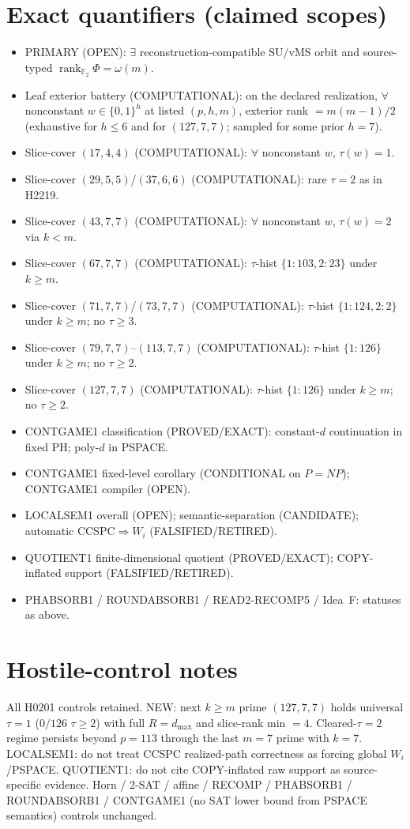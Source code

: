 \documentclass[11pt]{article}
\begin{document}
\section*{Exact quantifiers (claimed scopes)}
\begin{itemize}
\item PRIMARY (OPEN): $\exists$ reconstruction-compatible SU/vMS orbit and source-typed
  $\operatorname{rank}_{\mathbb F_2}\Phi=\omega(m)$.
\item Leaf exterior battery (COMPUTATIONAL): on the declared realization, $\forall$ nonconstant
  $w\in\{0,1\}^h$ at listed $(p,h,m)$, exterior rank $=m(m-1)/2$
  (exhaustive for $h\le6$ and for $(127,7,7)$; sampled for some prior $h{=}7$).
\item Slice-cover $(17,4,4)$ (COMPUTATIONAL): $\forall$ nonconstant $w$, $\tau(w)=1$.
\item Slice-cover $(29,5,5)$/$(37,6,6)$ (COMPUTATIONAL): rare $\tau{=}2$ as in H2219.
\item Slice-cover $(43,7,7)$ (COMPUTATIONAL): $\forall$ nonconstant $w$, $\tau(w)=2$ via $k{<}m$.
\item Slice-cover $(67,7,7)$ (COMPUTATIONAL): $\tau$-hist $\{1{:}103,2{:}23\}$ under $k{\ge}m$.
\item Slice-cover $(71,7,7)$/$(73,7,7)$ (COMPUTATIONAL): $\tau$-hist $\{1{:}124,2{:}2\}$ under $k{\ge}m$;
  no $\tau{\ge}3$.
\item Slice-cover $(79,7,7)$--$(113,7,7)$ (COMPUTATIONAL): $\tau$-hist $\{1{:}126\}$ under $k{\ge}m$;
  no $\tau{\ge}2$.
\item Slice-cover $(127,7,7)$ (COMPUTATIONAL): $\tau$-hist $\{1{:}126\}$ under $k{\ge}m$;
  no $\tau{\ge}2$.
\item CONTGAME1 classification (PROVED/EXACT): constant-$d$ continuation in fixed PH;
  poly-$d$ in PSPACE.
\item CONTGAME1 fixed-level corollary (CONDITIONAL on $P=NP$); CONTGAME1 compiler (OPEN).
\item LOCALSEM1 overall (OPEN); semantic-separation (CANDIDATE); automatic CCSPC$\Rightarrow W_i$ (FALSIFIED/RETIRED).
\item QUOTIENT1 finite-dimensional quotient (PROVED/EXACT); COPY-inflated support (FALSIFIED/RETIRED).
\item PHABSORB1 / ROUNDABSORB1 / READ2-RECOMP5 / Idea~F: statuses as above.
\end{itemize}

\section*{Hostile-control notes}
All H0201 controls retained. NEW: next $k{\ge}m$ prime $(127,7,7)$ holds universal
$\tau{=}1$ ($0/126$ $\tau{\ge}2$) with full $R{=}d_{\max}$ and slice-rank min $=4$.
Cleared-$\tau{=}2$ regime persists beyond $p{=}113$ through the last $m{=}7$ prime with $k{=}7$.
LOCALSEM1: do not treat CCSPC realized-path correctness as forcing global $W_i$/PSPACE.
QUOTIENT1: do not cite COPY-inflated raw support as source-specific evidence. Horn / 2-SAT / affine /
RECOMP / PHABSORB1 / ROUNDABSORB1 / CONTGAME1 (no SAT lower bound from PSPACE semantics)
controls unchanged.
\end{document}
